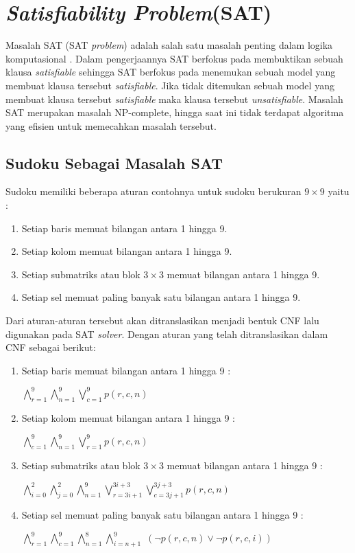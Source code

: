 \section{\textit{Satisfiability Problem}(SAT)}

Masalah SAT (SAT \textit{problem}) adalah salah satu masalah penting dalam logika komputasional \cite{huth2004logic}. Dalam pengerjaannya SAT berfokus pada membuktikan sebuah klausa \textit{satisfiable} sehingga SAT berfokus pada menemukan sebuah model yang membuat klausa tersebut \textit{satisfiable}. Jika tidak ditemukan sebuah model yang membuat klausa tersebut \textit{satisfiable} maka klausa tersebut \textit{unsatisfiable}. Masalah SAT merupakan masalah NP-complete, hingga saat ini tidak
terdapat algoritma yang efisien untuk memecahkan masalah tersebut. 

\subsection{Sudoku Sebagai Masalah SAT}
Sudoku memiliki beberapa aturan contohnya untuk sudoku berukuran  $9 \times 9$ yaitu :

\begin{enumerate}
	\item Setiap baris memuat bilangan antara 1 hingga 9.
	\item Setiap kolom memuat bilangan antara 1 hingga 9.
	\item Setiap submatriks atau blok $3 \times 3$
	 memuat bilangan antara 1 hingga 9.
	\item Setiap sel memuat paling banyak satu bilangan antara 1 hingga 9.
\end{enumerate}

Dari aturan-aturan tersebut akan ditranslasikan menjadi bentuk CNF lalu digunakan pada SAT \textit{solver}. Dengan aturan yang telah ditranslasikan dalam CNF sebagai berikut:

\begin{enumerate}
	\item Setiap baris memuat bilangan antara 1 
	hingga 9 : 
	
	$\bigwedge_{r=1}^{9}$$\bigwedge_{n=1}^{9}$$\bigvee_{c=1}^{9}$$p\left(r,c,n\right)$
	
	\item Setiap kolom memuat bilangan antara 1 hingga 9 : 
	
	$\bigwedge_{c=1}^{9}$$\bigwedge_{n=1}^{9}$$\bigvee_{r=1}^{9}$$p\left(r,c,n\right)$
	
	\item Setiap submatriks atau blok $3 \times 3$
	memuat bilangan antara 1 hingga 9 : 
	
	$\bigwedge_{i=0}^{2}$$\bigwedge_{j=0}^{2}$$\bigwedge_{n=1}^{9}$$\bigvee_{r=3i+1}^{3i+3}$$\bigvee_{c=3j+1}^{3j+3}$$p\left(r,c,n\right)$
	
	\item Setiap sel memuat paling banyak satu bilangan antara 1 hingga 9 : 
	
	$\bigwedge_{r=1}^{9}$$\bigwedge_{c=1}^{9}$$\bigwedge_{n=1}^{8}$$\bigwedge_{i=n+1}^{9}$
	$\left(\neg p\left(r,c,n\right)\vee\neg p\left(r,c,i\right)\right)$
	
\end{enumerate}

